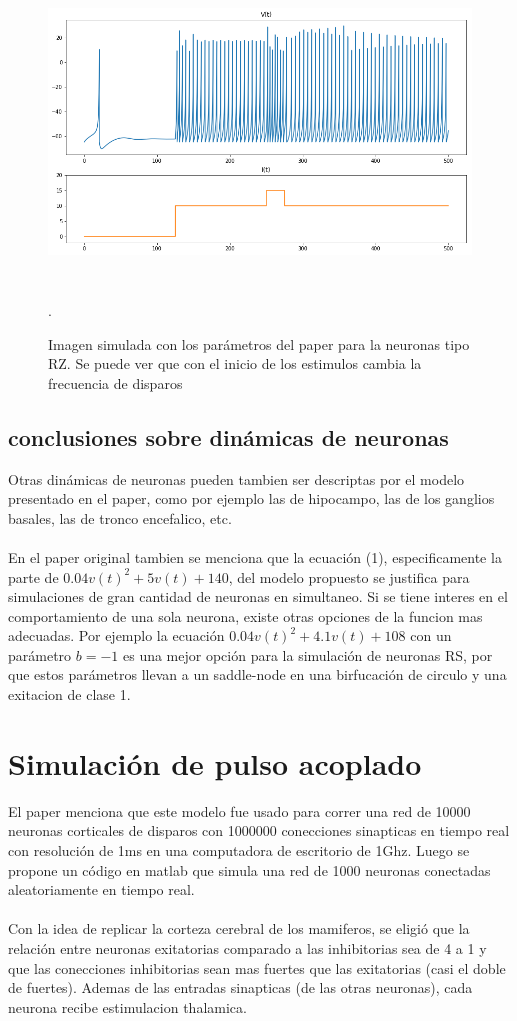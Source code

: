 \documentclass[12pt]{article}
\begin{document}
\begin{figure}[h!]
    \centering
        \includegraphics[height=8cm]{images/RZ.png}
    \caption[fontsize=2pt]{Imagen simulada con los parámetros del paper para la neuronas tipo RZ. Se puede ver que con el inicio de los estimulos cambia la frecuencia de disparos}.
\end{figure}

\subsection{conclusiones sobre dinámicas de neuronas}

Otras dinámicas de neuronas pueden tambien ser descriptas por el modelo presentado en el paper, como por ejemplo las de hipocampo, las de los ganglios basales, las de tronco encefalico, etc. \\ \\
En el paper original tambien se menciona que la ecuación (1), especificamente la parte de $0.04 v(t)^2 + 5 v(t) + 140$, del modelo propuesto se justifica para simulaciones de gran cantidad de neuronas en simultaneo.
Si se tiene interes en el comportamiento de una sola neurona, existe otras opciones de la funcion mas adecuadas. Por ejemplo la ecuación $0.04 v(t)^2 + 4.1 v(t) + 108$ con un parámetro $b = -1$ es una mejor opción para la simulación de neuronas RS, por que
estos parámetros llevan a un saddle-node en una birfucación de circulo y una exitacion de clase 1. \cite{saddleNode}

\section{Simulación de pulso acoplado}
El paper menciona que este modelo fue usado para correr una red de 10000 neuronas corticales de disparos con 1000000 conecciones sinapticas en tiempo real con resolución de 1ms en una computadora de escritorio de 1Ghz.
Luego se propone un código en matlab que simula una red de 1000 neuronas conectadas aleatoriamente en tiempo real. \\ \\
Con la idea de replicar la corteza cerebral de los mamiferos, se eligió que la relación entre neuronas exitatorias comparado a las inhibitorias sea de 4 a 1 y que las conecciones inhibitorias sean mas fuertes que las exitatorias (casi el doble de fuertes).
Ademas de las entradas sinapticas (de las otras neuronas), cada neurona recibe estimulacion thalamica. \\
\end{document}
